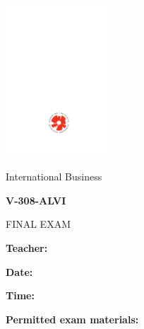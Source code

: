 \documentclass[a4paper,12pt,addpoints]{exam}
\begin{document}
\begin{titlepage}
  \sffamily
  \begin{center}
    \includegraphics[width=40mm]{ru-logo}
    \par\vspace{40pt}
    \Huge International Business
    \par\medskip\Large\textbf{V-308-ALVI}
    \par\medskip\Large FINAL EXAM
  \end{center}
  \vfill
  \begin{flushleft}
    \textbf{Teacher:}
    \par\medskip\textbf{Date:}
    \par\medskip\textbf{Time:}
    \par\medskip\textbf{Permitted exam materials:}
  \end{flushleft}
  \vspace {33pt}
  \begin{flushleft}
    \par\vspace{5mm}
  \end{flushleft}
\end{titlepage}
\end{document}
